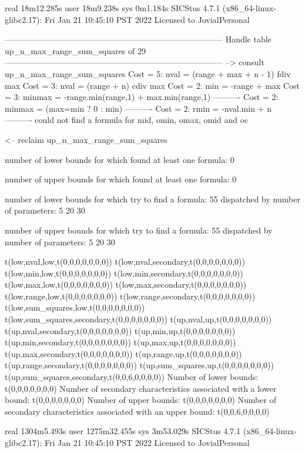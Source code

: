 real	18m12.285s
user	18m9.238s
sys	0m1.184s
SICStus 4.7.1 (x86_64-linux-glibc2.17): Fri Jan 21 10:45:10 PST 2022
Licensed to JovialPersonal


--------------------------------------------------------------------------------
Handle table up_n_max_range_sum_squares of 29
--------------------------------------------------------------------------------
--> consult up_n_max_range_sum_squares
Cost =  5:  nval   = (range + max + n - 1) fdiv max
Cost =  3:  nval   = (range + n) cdiv max
Cost =  2:  min    = -range + max
Cost =  3:  minmax = -range.min(range,1) + max.min(range,1)
----------
Cost =  2:  minmax = (max=min ? 0 : min)
----------
Cost =  2:  rmin   = -nval.min + n
----------
could not find a formula for mid, omin, omax, omid and oc

<-- reclaim up_n_max_range_sum_squares

number of lower bounds for which found at least one formula: 0

number of upper bounds for which found at least one formula: 0

number of lower bounds for which try to find a formula: 55
dispatched by number of parameters: 5  20  30

number of upper bounds for which try to find a formula: 55
dispatched by number of parameters: 5  20  30

t(low,nval,low,t(0,0,0,0,0,0,0))
t(low,nval,secondary,t(0,0,0,0,0,0,0))
t(low,min,low,t(0,0,0,0,0,0,0))
t(low,min,secondary,t(0,0,0,0,0,0,0))
t(low,max,low,t(0,0,0,0,0,0,0))
t(low,max,secondary,t(0,0,0,0,0,0,0))
t(low,range,low,t(0,0,0,0,0,0,0))
t(low,range,secondary,t(0,0,0,0,0,0,0))
t(low,sum_squares,low,t(0,0,0,0,0,0,0))
t(low,sum_squares,secondary,t(0,0,0,0,0,0,0))
t(up,nval,up,t(0,0,0,0,0,0,0))
t(up,nval,secondary,t(0,0,0,0,0,0,0))
t(up,min,up,t(0,0,0,0,0,0,0))
t(up,min,secondary,t(0,0,0,0,0,0,0))
t(up,max,up,t(0,0,0,0,0,0,0))
t(up,max,secondary,t(0,0,0,0,0,0,0))
t(up,range,up,t(0,0,0,0,0,0,0))
t(up,range,secondary,t(0,0,0,0,0,0,0))
t(up,sum_squares,up,t(0,0,0,0,0,0,0))
t(up,sum_squares,secondary,t(0,0,6,0,0,0,0))
Number of lower bounds:                                             t(0,0,0,0,0,0,0)
Number of secondary characteristics associated with a lower bound:  t(0,0,0,0,0,0,0)
Number of upper bounds:                                             t(0,0,0,0,0,0,0)
Number of secondary characteristics associated with an upper bound: t(0,0,6,0,0,0,0)

real	1304m5.493s
user	1275m32.455s
sys	3m53.029s
SICStus 4.7.1 (x86_64-linux-glibc2.17): Fri Jan 21 10:45:10 PST 2022
Licensed to JovialPersonal


